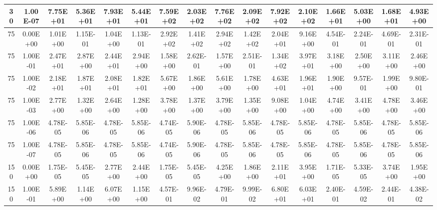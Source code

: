 \begin{table}[H]
\begin{center}
{\begin{tabular}{|c|c|c|c|c|c|c|c|c|c|c|c|c|c|c|c|}
30    &    1.00E-07    &    7.75E+01    &    5.36E+01    &    7.93E+01    &    5.44E+01    &    7.59E+02    &    2.03E+02    &    7.76E+02    &    2.09E+02    &    7.92E+02    &    2.10E+02    &    1.66E+01    &    5.03E+00    &    1.68E+01    &    4.93E+00    \\ \hline
75    &    0.00E+00    &    1.01E+00    &    1.15E-01    &    1.04E+00    &    1.13E-01    &    2.92E+02    &    1.41E+02    &    2.94E+02    &    1.42E+02    &    2.04E+01    &    9.16E+00    &    4.54E-01    &    2.24E-01    &    4.69E-01    &    2.31E-01    \\ \hline
75    &    1.00E-01    &    2.47E+01    &    2.87E+00    &    2.44E+01    &    2.94E+00    &    1.58E+00    &    2.62E-01    &    1.57E+00    &    2.51E-01    &    1.34E+02    &    3.97E+01    &    3.18E+00    &    2.50E+00    &    3.11E+00    &    2.46E+00    \\ \hline
75    &    1.00E-02    &    2.18E+01    &    1.87E+01    &    2.08E+01    &    1.82E+01    &    5.67E+00    &    1.86E+00    &    5.61E+00    &    1.78E+00    &    4.63E+01    &    1.96E+01    &    1.90E+00    &    9.57E-01    &    1.99E+00    &    9.80E-01    \\ \hline
75    &    1.00E-03    &    2.77E+00    &    1.32E+00    &    2.64E+00    &    1.28E+00    &    3.78E+00    &    1.37E+00    &    3.79E+00    &    1.35E+00    &    9.08E+00    &    1.04E+00    &    4.74E+00    &    3.41E+00    &    4.78E+00    &    3.46E+00    \\ \hline
75    &    1.00E-06    &    4.78E-05    &    5.85E-06    &    4.78E-05    &    5.85E-06    &    4.74E-05    &    5.90E-06    &    4.78E-05    &    5.85E-06    &    4.78E-05    &    5.85E-06    &    4.78E-05    &    5.85E-06    &    4.78E-05    &    5.85E-06    \\ \hline
75    &    1.00E-07    &    4.78E-05    &    5.85E-06    &    4.78E-05    &    5.85E-06    &    4.74E-05    &    5.90E-06    &    4.78E-05    &    5.85E-06    &    4.78E-05    &    5.85E-06    &    4.78E-05    &    5.85E-06    &    4.78E-05    &    5.85E-06    \\ \hline
150    &    0.00E+00    &    1.75E-05    &    5.45E-05    &    2.77E+00    &    2.44E+00    &    1.75E-05    &    5.45E-05    &    4.25E+00    &    1.86E+00    &    2.11E+01    &    3.95E+00    &    1.71E-05    &    5.33E-05    &    3.74E+00    &    1.95E+00    \\ \hline
150    &    1.00E-01    &    5.89E+00    &    1.14E+00    &    6.07E+00    &    1.15E+00    &    4.57E-01    &    9.96E-02    &    4.79E-01    &    9.99E-02    &    6.80E+01    &    6.03E+01    &    2.40E-01    &    4.59E-02    &    2.44E-01    &    4.38E-02    \\ \hline

\end{tabular}}
\end{center}
\end{table}

